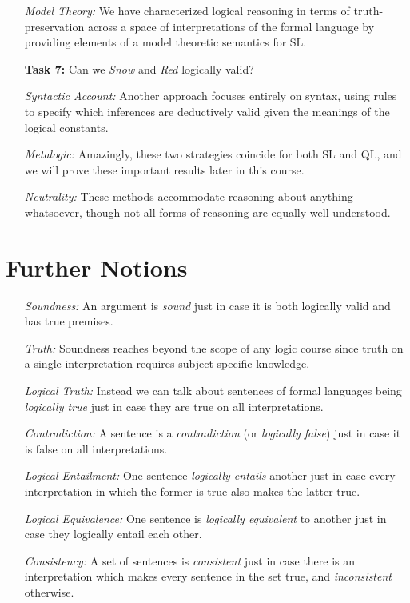 \documentclass[a4paper, 11pt]{article} %
\begin{document}
\begin{enumerate}[leftmargin=1.2in,labelsep=.15in] %
  \item[\it Model Theory:] We have characterized logical reasoning in terms of truth-preservation across a space of interpretations of the formal language by providing elements of a model theoretic semantics for SL.
  \item[\bf Task 7:] Can we \textit{Snow} and \textit{Red} logically valid?
  \item[\it Syntactic Account:] Another approach focuses entirely on syntax, using rules to specify which inferences are deductively valid given the meanings of the logical constants.
  \item[\it Metalogic:] Amazingly, these two strategies coincide for both SL and QL, and we will prove these important results later in this course.
  \item[\it Neutrality:] These methods accommodate reasoning about anything whatsoever, though not all forms of reasoning are equally well understood.
\end{enumerate}


\section*{Further Notions}

\begin{enumerate}[leftmargin=1.2in,labelsep=.15in] %
  \item[\it Soundness:] An argument is \textit{sound} just in case it is both logically valid and has true premises.
  \item[\it Truth:] Soundness reaches beyond the scope of any logic course since truth on a single interpretation requires subject-specific knowledge.
  \item[\it Logical Truth:] Instead we can talk about sentences of formal languages being \textit{logically true} just in case they are true on all interpretations.
  \item[\it Contradiction:] A sentence is a \textit{contradiction} (or \textit{logically false}) just in case it is false on all interpretations.
  \item[\it Logical Entailment:] One sentence \textit{logically entails} another just in case every interpretation in which the former is true also makes the latter true.
  \item[\it Logical Equivalence:] One sentence is \textit{logically equivalent} to another just in case they logically entail each other.
  \item[\it Consistency:] A set of sentences is \textit{consistent} just in case there is an interpretation which makes every sentence in the set true, and \textit{inconsistent} otherwise.
\end{enumerate}
\end{document}
